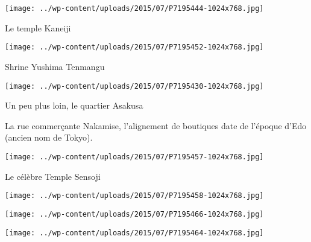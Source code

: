  

\begin{center} \texttt{[image: ../wp-content/uploads/2015/07/P7195444-1024x768.jpg]} \end{center}

 

 Le temple Kaneiji 

 

\begin{center} \texttt{[image: ../wp-content/uploads/2015/07/P7195452-1024x768.jpg]} \end{center}

 

 Shrine Yushima Tenmangu 

 

\begin{center} \texttt{[image: ../wp-content/uploads/2015/07/P7195430-1024x768.jpg]} \end{center}

 

 Un peu plus loin, le quartier Asakusa 

 La rue commerçante Nakamise, l'alignement de boutiques date de l'époque d'Edo (ancien nom de Tokyo). 

 

\begin{center} \texttt{[image: ../wp-content/uploads/2015/07/P7195457-1024x768.jpg]} \end{center}

 

 Le célèbre Temple Sensoji 

 

\begin{center} \texttt{[image: ../wp-content/uploads/2015/07/P7195458-1024x768.jpg]} \end{center}

 

 

\begin{center} \texttt{[image: ../wp-content/uploads/2015/07/P7195466-1024x768.jpg]} \end{center}

 

 

\begin{center} \texttt{[image: ../wp-content/uploads/2015/07/P7195464-1024x768.jpg]} \end{center}

